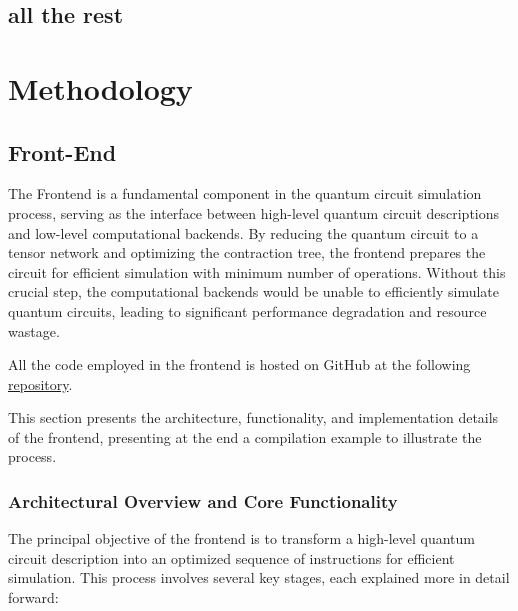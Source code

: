 \documentclass[12pt,oneside,a4paper]{article}
\begin{document}
\subsection{all the rest}


\section{Methodology}

\subsection{Front-End}



The Frontend is a fundamental component in the quantum circuit simulation process, serving as the interface between high-level quantum circuit descriptions and low-level computational backends. By reducing the quantum circuit to a tensor network and optimizing the contraction tree, the frontend prepares the circuit for efficient simulation with minimum number of operations. Without this crucial step, the computational backends would be unable to efficiently simulate quantum circuits, leading to significant performance degradation and resource wastage.

All the code employed in the frontend is hosted on GitHub at the following \href{https://github.com/federico123579/HPPS24-Quantum-Simulation}{repository}.

This section presents the architecture, functionality, and implementation details of the frontend, presenting at the end a compilation example to illustrate the process.

\subsubsection{Architectural Overview and Core Functionality}

The principal objective of the frontend is to transform a high-level quantum circuit description into an optimized sequence of instructions for efficient simulation. This process involves several key stages, each explained more in detail forward:
\end{document}
